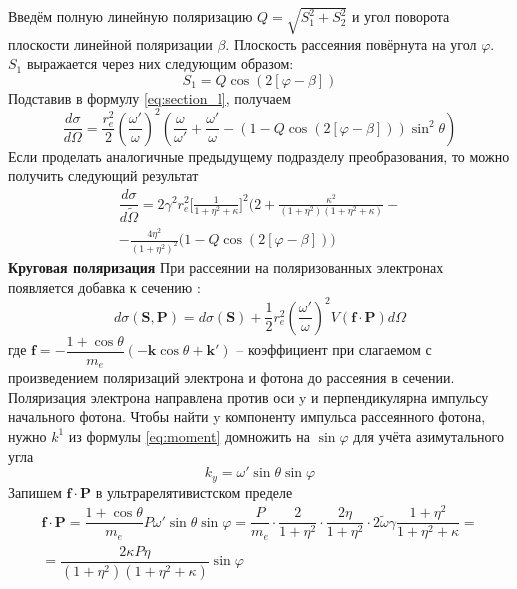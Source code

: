 \documentclass[14pt, a4paper]{extreport}
\begin{document}
Введём полную линейную поляризацию $Q = \sqrt{S_1^2+S_2^2}$ и угол поворота плоскости линейной поляризации $\beta$. Плоскость рассеяния повёрнута на угол $\varphi$.
$S_1$ выражается через них следующим образом:
\begin{equation}
    S_1 = Q \cos(2[\varphi-\beta])
\end{equation}
Подставив в формулу \eqref{eq:section_l}, получаем
\begin{equation}
    \dfrac{d\sigma}{d\Omega} = \frac{r_e^2}{2} \left( \frac{\omega'}{\omega} \right)^2 
    \left( \frac{\omega}{\omega'} + \frac{\omega'}{\omega} - \left(1- Q \cos(2[\varphi-\beta])\right)\sin^2\theta \right)
\end{equation}
Если проделать аналогичные предыдущему подразделу преобразования, то можно получить следующий результат
\begin{equation}
\begin{aligned}
\label{eq:linear_pol}
 \dfrac{d\sigma}{d\widetilde{\Omega}} = 2\gamma^2 r_e^2 
 \bigg[\frac{1}{1+\eta^2+\kappa}\bigg]^2 
 \bigg(
 2 + \frac{\kappa^2}{(1+\eta^2)(1+\eta^2+\kappa)}- \\
 - \frac{4\eta^2}{(1+\eta^2)^2}
 \big(1-Q\cos(2[\varphi - \beta])\bigg)
\end{aligned}
\end{equation}
\textbf{Круговая поляризация}
При рассеянии на поляризованных электронах появляется добавка к сечению \cite{lifshitz}:
\begin{equation}
    d\sigma(\bm{S}, \bm{P}) =  d\sigma(\bm{S}) + \dfrac{1}{2}r_e^2\left( \frac{\omega'}{\omega} \right)^2 V (\bm{f}\cdot\bm{P})d\Omega
\end{equation}
где $\bm{f} = -\dfrac{1+\cos\theta}{m_e}(-\bm{k}\cos\theta + \bm{k'})$ -- коэффициент при слагаемом с произведением поляризаций электрона и фотона до рассеяния в сечении.
Поляризация электрона направлена против оси y и перпендикулярна импульсу начального фотона. Чтобы найти y компоненту импульса рассеянного фотона, нужно $k^1$ из формулы \eqref{eq:moment} домножить на $\sin \varphi$ для учёта азимутального угла
\begin{equation}
    k_y = \omega' \sin \theta \sin\varphi
\end{equation}
Запишем $\bm{f}\cdot\bm{P}$ в ультрарелятивистском пределе
\begin{equation}
\begin{aligned}
        \bm{f}\cdot\bm{P} = \dfrac{1+\cos\theta}{m_e}P \omega'\sin \theta\sin\varphi = \dfrac{P}{m_e} \cdot\dfrac{2}{1+\eta^2}\cdot \dfrac{2\eta}{1 + \eta^2} \cdot 2\widetilde{\omega}\gamma\dfrac{1+\eta^2}{1 + \eta^2 + \kappa} =\\
        = \dfrac{2\kappa P \eta}{(1+\eta^2)(1+\eta^2+\kappa)}\sin\varphi
\end{aligned}
\end{equation}
\end{document}
